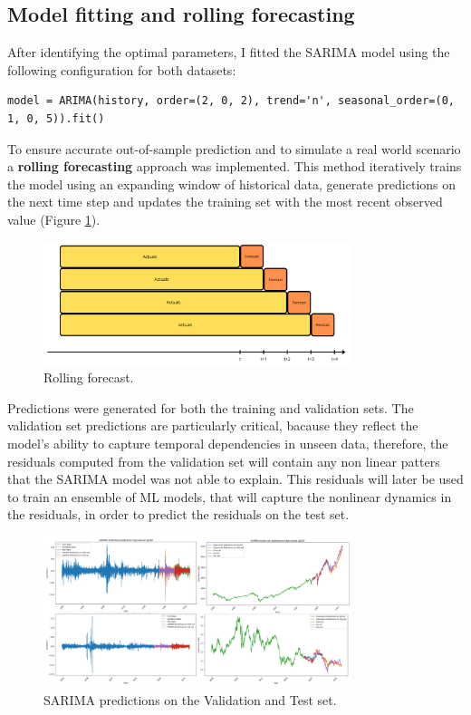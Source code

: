 \subsection{Model fitting and rolling forecasting} 
After identifying the optimal parameters, I fitted the SARIMA model using the following configuration for both datasets:
\begin{verbatim}
model = ARIMA(history, order=(2, 0, 2), trend='n', seasonal_order=(0, 1, 0, 5)).fit()
\end{verbatim}
To ensure accurate out-of-sample prediction and to simulate a real world scenario a \textbf{rolling forecasting} approach was implemented. This method iteratively trains the model using an expanding window of historical data, generate predictions on the next time step and updates the training set with the most recent observed value (Figure \ref{fig:Rolling forecas}).
 \begin{figure}[H]
    \centering
    \includegraphics[width=0.8\textwidth]{Machine_learning_thesis/Images/Rolling forecast.png}
    \caption{Rolling forecast.} 
    \label{fig:Rolling forecas}
\end{figure}
Predictions were generated for both the training and validation sets. The validation set predictions are particularly critical, bacause they reflect the model's ability to capture temporal dependencies in unseen data, therefore, the residuals computed from the validation set will contain any non linear patters that the SARIMA model was not able to explain. This residuals will later be used to train an ensemble of ML models, that will capture the nonlinear dynamics in the residuals, in order to predict the residuals on the test set.
 \begin{figure}[H]
    \centering
    \includegraphics[width=0.8\textwidth]{Machine_learning_thesis/Images/SARIMA predictions.png}
    \caption{SARIMA predictions on the Validation and Test set.} 
    \label{fig:SARIMA predictions}
\end{figure}

